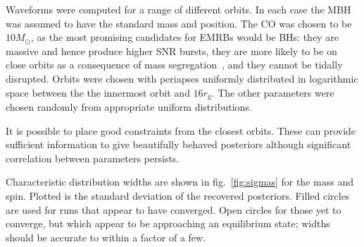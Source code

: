\documentclass[11pt,twoside]{article}
\begin{document}
Waveforms were computed for a range of different orbits. In each case the MBH was assumed to have the standard mass and position. The CO was chosen to be $10 M_\odot$, as the most promising candidates for EMRBs would be BHs: they are massive and hence produce higher SNR bursts, they are more likely to be on close orbits as a consequence of mass segregation~\citep{Bahcall1977, Alexander2009}, and they cannot be tidally disrupted. Orbits were chosen with periapses uniformly distributed in logarithmic space between the the innermost orbit and $16 r_\mathrm{g}$. The other parameters were chosen randomly from appropriate uniform distributions. 

It is possible to place good constraints from the closest orbits. These can provide sufficient information to give beautifully behaved posteriors although significant correlation between parameters persists.

Characteristic distribution widths are shown in fig.~\ref{fig:sigmas} for the mass and spin. Plotted is the standard deviation of the recovered posteriors. Filled circles are used for runs that appear to have converged. Open circles for those yet to converge, but which appear to be approaching an equilibrium state; widths should be accurate to within a factor of a few.
\end{document}
